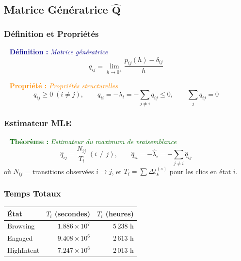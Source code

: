 \documentclass[11pt,a4paper]{article}
\newenvironment{defbox}[1]{%
  \vspace{3pt}\begin{framed}
  \noindent{\color{NavyBlue}\rule{0.3cm}{3pt}}~%
  \textcolor{DarkBlue}{\textbf{Définition :} \textit{#1}}\\[3pt]}
  {\end{framed}\vspace{3pt}}
\newenvironment{thmbox}[1]{%
  \vspace{3pt}\begin{framed}
  \noindent{\color{DarkGreen}\rule{0.3cm}{3pt}}~%
  \textcolor{DarkGreen}{\textbf{Théorème :} \textit{#1}}\\[3pt]}
  {\end{framed}\vspace{3pt}}
\newenvironment{propbox}[1]{%
  \vspace{3pt}\begin{framed}
  \noindent{\color{DarkOrange}\rule{0.3cm}{3pt}}~%
  \textcolor{DarkOrange}{\textbf{Propriété :} \textit{#1}}\\[3pt]}
  {\end{framed}\vspace{3pt}}
\newcommand{\mat}[1]{\mathbf{#1}}
\begin{document}
\subsection{Matrice Génératrice $\hat{\mat{Q}}$}

\subsubsection{Définition et Propriétés}

\begin{defbox}{Matrice génératrice}
\[
q_{ij} = \lim_{h \to 0^+} \frac{p_{ij}(h) - \delta_{ij}}{h}
\]
\end{defbox}

\begin{propbox}{Propriétés structurelles}
\[
q_{ij} \geq 0 \;(i\neq j), \qquad
q_{ii} = -\lambda_i = -\sum_{j \neq i} q_{ij} \leq 0, \qquad
\sum_{j} q_{ij} = 0
\]
\end{propbox}

\subsubsection{Estimateur MLE}

\begin{thmbox}{Estimateur du maximum de vraisemblance}
\[
\boxed{\hat{q}_{ij} = \frac{N_{ij}}{T_i} \;(i \neq j),}
\qquad
\hat{q}_{ii} = -\hat{\lambda}_i = -\sum_{j \neq i} \hat{q}_{ij}
\]
où $N_{ij}$ = transitions observées $i\to j$, et $T_i = \sum \Delta t_k^{(s)}$ pour les clics en état $i$.
\end{thmbox}

\subsubsection{Temps Totaux}

\begin{center}
\begin{tabular}{lrr}
\toprule
\textbf{État} & $T_i$ \textbf{(secondes)} & $T_i$ \textbf{(heures)} \\
\midrule
\rowcolor{LightBlue}   Browsing   & $1.886 \times 10^7$ & $5\,238$ h \\
\rowcolor{LightOrange} Engaged    & $9.408 \times 10^6$ & $2\,613$ h \\
\rowcolor{LightRed}    HighIntent & $7.247 \times 10^6$ & $2\,013$ h \\
\bottomrule
\end{tabular}
\end{center}
\end{document}
